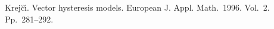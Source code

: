 \documentclass[12pt]{llncs}
\begin{document}
\begin{thebibliography}{9}




 Krej\u{c}\'{\i}.  Vector hysteresis models. European J. Appl. Math.~1996. Vol.~2. Pp.~281--292.













\end{thebibliography}
\end{document}
